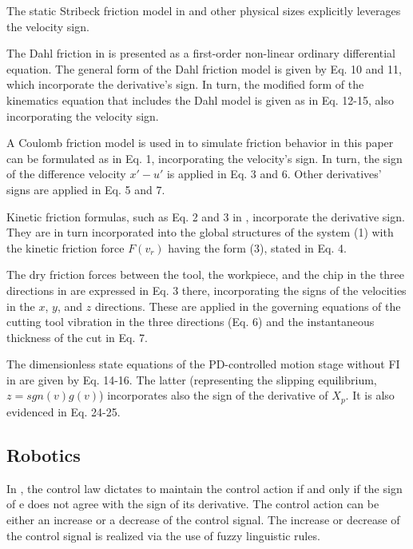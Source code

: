 \documentclass[11pt]{book}
\begin{document}
The static Stribeck friction model in \cite{ruderman2017break} and
other physical sizes explicitly leverages the velocity sign.

The Dahl friction in \cite{choi2017tension} is presented as a first-order
non-linear ordinary differential equation. The general form of the
Dahl friction model is given by Eq. 10 and 11, which incorporate the
derivative's sign. In turn, the modified form of the kinematics equation
that includes the Dahl model is given as in Eq. 12-15, also incorporating
the velocity sign.

A Coulomb friction model is used in \cite{ismail2017passive} to simulate
friction behavior in this paper can be formulated as in Eq. 1, incorporating
the velocity's sign. In turn, the sign of the difference velocity
$x'-u'$ is applied in Eq. 3 and 6. Other derivatives' signs are applied
in Eq. 5 and 7.

Kinetic friction formulas, such as Eq. 2 and 3 in \cite{chen2018global},
incorporate the derivative sign. They are in turn incorporated into
the global structures of the system (1) with the kinetic friction
force $F\left(v_{r}\right)$ having the form (3), stated in Eq. 4.

The dry friction forces between the tool, the workpiece, and the chip
in the three directions in \cite{wang2018bifurcation} are expressed
in Eq. 3 there, incorporating the signs of the velocities in the $x$,
$y$, and $z$ directions. These are applied in the governing equations
of the cutting tool vibration in the three directions (Eq. 6) and
the instantaneous thickness of the cut in Eq. 7.

The dimensionless state equations of the PD-controlled motion stage
without FI in \cite{dong2019friction} are given by Eq. 14-16. The
latter (representing the slipping equilibrium, $z=sgn\left(v\right)g\left(v\right)$)
incorporates also the sign of the derivative of $X_{p}$. It is also
evidenced in Eq. 24-25.


\subsection{Robotics}

In \cite{tzafestas1999simple}, the control law dictates to maintain
the control action if and only if the sign of e does not agree with
the sign of its derivative. The control action can be either an increase
or a decrease of the control signal. The increase or decrease of the
control signal is realized via the use of fuzzy linguistic rules.
\end{document}
